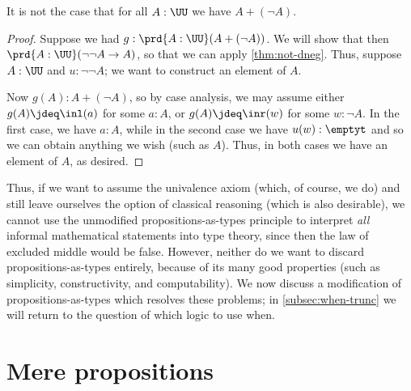 \begin{cor}\label{thm:not-lem}
  It is not the case that for all $A:\UU$ we have $A+(\neg A)$.
\end{cor}
\begin{proof}
  Suppose we had $g:\prd{A:\UU} (A+(\neg A))$.
  We will show that then $\prd{A:\UU} (\neg\neg A \to A)$, so that we can apply \cref{thm:not-dneg}.
  Thus, suppose $A:\UU$ and $u:\neg\neg A$; we want to construct an element of $A$.

  Now $g(A):A+(\neg A)$, so by case analysis, we may assume either $g(A)\jdeq \inl(a)$ for some $a:A$, or $g(A)\jdeq \inr(w)$ for some $w:\neg A$.
  In the first case, we have $a:A$, while in the second case we have $u(w):\emptyt$ and so we can obtain anything we wish (such as $A$).
  Thus, in both cases we have an element of $A$, as desired.
\end{proof}

Thus, if we want to assume the univalence axiom (which, of course, we do) and still leave ourselves the option of classical reasoning (which is also desirable), we cannot use the unmodified propositions-as-types principle to interpret \emph{all} informal mathematical statements into type theory, since then the law of excluded middle would be false.
However, neither do we want to discard propositions-as-types entirely, because of its many good properties (such as simplicity, constructivity, and computability).
We now discuss a modification of propositions-as-types which resolves these problems; in \cref{subsec:when-trunc} we will return to the question of which logic to use when.
%
%
%

\section{Mere propositions}
